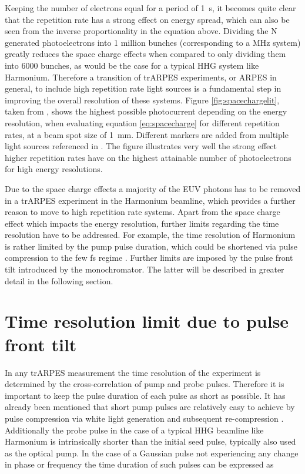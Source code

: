Keeping the number of electrons equal for a period of \qty{1}{\second}, it becomes quite clear that the repetition rate has a strong effect on energy spread, which can also be seen from the inverse proportionality in the equation above.
Dividing the N generated photoelectrons into 1 million bunches (corresponding to a \unit{\mega\hertz} system) greatly reduces the space charge effects when compared to only dividing them into 6000 bunches, as would be the case for a typical HHG system like Harmonium.
Therefore a transition of trARPES experiments, or ARPES in general, to include high repetition rate light sources is a fundamental step in improving the overall resolution of these systems.
Figure \ref{fig:spacechargelit}, taken from \cite{corder_ultrafast_2018}, shows the highest possible photocurrent depending on the energy resolution, when evaluating equation \ref{eq:spacecharge} for different repetition rates, at a beam spot size of \qty{1}{\milli\meter}.
Different markers are added from multiple light sources referenced in \cite{corder_ultrafast_2018}.
The figure illustrates very well the strong effect higher repetition rates have on the highest attainable number of photoelectrons for high energy resolutions.

Due to the space charge effects a majority of the EUV photons has to be removed in a trARPES experiment in the Harmonium beamline, which provides a further reason to move to high repetition rate systems.
Apart from the space charge effect which impacts the energy resolution, further limits regarding the time resolution have to be addressed.
For example, the time resolution of Harmonium is rather limited by the pump pulse duration, which could be shortened via pulse compression to the few \unit{\femto\second} regime \cite{nisoli_compression_1997}.
Further limits are imposed by the pulse front tilt introduced by the monochromator.
The latter will be described in greater detail in the following section.
	
\section{Time resolution limit due to pulse front tilt}

In any trARPES measurement the time resolution of the experiment is determined by the cross-correlation of pump and probe pulses.
Therefore it is important to keep the pulse duration of each pulse as short as possible.
It has already been mentioned that short pump pulses are relatively easy to achieve by pulse compression via white light generation and subsequent re-compression \cite{nisoli_compression_1997}.
Additionally the probe pulse in the case of a typical HHG beamline like Harmonium is intrinsically shorter than the initial seed pulse, typically also used as the optical pump.
In the case of a Gaussian pulse not experiencing any change in phase or frequency the time duration of such pulses can be expressed as

